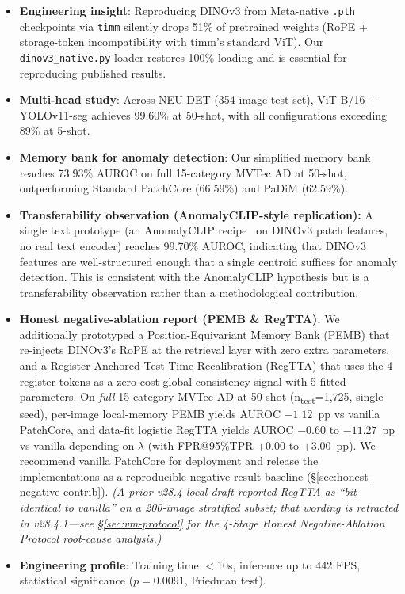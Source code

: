 \documentclass[journal]{IEEEtran}
\begin{document}
\begin{itemize}\itemsep0pt
    \item \textbf{Engineering insight}: Reproducing DINOv3 from Meta-native \texttt{.pth} checkpoints via \texttt{timm} silently drops 51\% of pretrained weights (RoPE + storage-token incompatibility with timm's standard ViT). Our \texttt{dinov3\_native.py} loader restores 100\% loading and is essential for reproducing published results.
    \item \textbf{Multi-head study}: Across NEU-DET (354-image test set), ViT-B/16 + YOLOv11-seg achieves 99.60\% at 50-shot, with all configurations exceeding 89\% at 5-shot.
    \item \textbf{Memory bank for anomaly detection}: Our simplified memory bank reaches 73.93\% AUROC on full 15-category MVTec AD at 50-shot, outperforming Standard PatchCore (66.59\%) and PaDiM (62.59\%).
    \item \textbf{Transferability observation (AnomalyCLIP-style replication):} A single text prototype (an AnomalyCLIP recipe~\cite{ref33} on DINOv3 patch features, no real text encoder) reaches 99.70\% AUROC, indicating that DINOv3 features are well-structured enough that a single centroid suffices for anomaly detection. This is consistent with the AnomalyCLIP hypothesis but is a transferability observation rather than a methodological contribution.
    \item \textbf{Honest negative-ablation report (PEMB \& RegTTA).} We additionally prototyped a Position-Equivariant Memory Bank (PEMB) that re-injects DINOv3's RoPE at the retrieval layer with zero extra parameters, and a Register-Anchored Test-Time Recalibration (RegTTA) that uses the 4 register tokens as a zero-cost global consistency signal with 5 fitted parameters. On \emph{full} 15-category MVTec AD at 50-shot (n\textsubscript{test}=1{,}725, single seed), per-image local-memory PEMB yields AUROC $-1.12$~pp vs vanilla PatchCore, and data-fit logistic RegTTA yields AUROC $-0.60$ to $-11.27$~pp vs vanilla depending on $\lambda$ (with FPR@95\%TPR $+0.00$ to $+3.00$~pp). We recommend vanilla PatchCore for deployment and release the implementations as a reproducible negative-result baseline (\S\ref{sec:honest-negative-contrib}). \emph{(A prior v28.4 local draft reported RegTTA as ``bit-identical to vanilla'' on a 200-image stratified subset; that wording is retracted in v28.4.1---see \S\ref{sec:vm-protocol} for the 4-Stage Honest Negative-Ablation Protocol root-cause analysis.)}
    \item \textbf{Engineering profile}: Training time $<$10s, inference up to 442 FPS, statistical significance ($p = 0.0091$, Friedman test).
\end{itemize}
\end{document}
